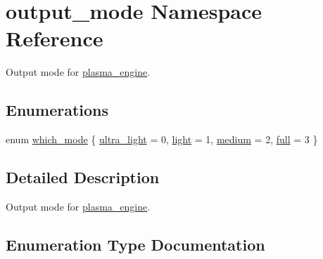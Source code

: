 \hypertarget{namespaceoutput__mode}{}\section{output\+\_\+mode Namespace Reference}
\label{namespaceoutput__mode}


Output mode for \hyperlink{classplasma__engine}{plasma\+\_\+engine}.  


\subsection*{Enumerations}
\begin{DoxyCompactItemize}
\item 
enum \hyperlink{namespaceoutput__mode_ad0fdcb2c9bc1b66e01306939b1bf5cf7}{which\+\_\+mode} \{ \hyperlink{namespaceoutput__mode_ad0fdcb2c9bc1b66e01306939b1bf5cf7a74bfd2ad025d3033cd4aa674c54d2c2f}{ultra\+\_\+light} = 0, 
\hyperlink{namespaceoutput__mode_ad0fdcb2c9bc1b66e01306939b1bf5cf7a4b13409721d5873dca6864f02a65946b}{light} = 1, 
\hyperlink{namespaceoutput__mode_ad0fdcb2c9bc1b66e01306939b1bf5cf7a0511604d3014c72e8897f15dd1512108}{medium} = 2, 
\hyperlink{namespaceoutput__mode_ad0fdcb2c9bc1b66e01306939b1bf5cf7a5da31fc0f5db06dad5f3a6b3f45eef53}{full} = 3
 \}
\end{DoxyCompactItemize}


\subsection{Detailed Description}
Output mode for \hyperlink{classplasma__engine}{plasma\+\_\+engine}. 

\subsection{Enumeration Type Documentation}

